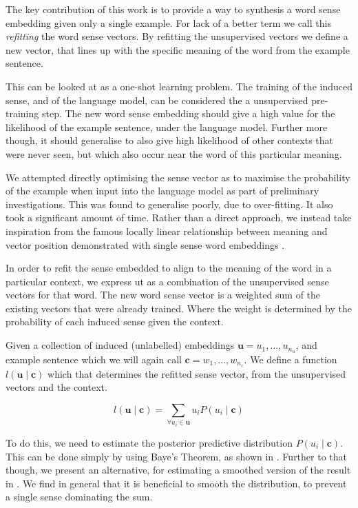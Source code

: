\documentclass{sig-alternate}
\renewcommand{\c}{\mathbf{c}}
\renewcommand{\u}{\mathbf{u}}
\begin{document}
The key contribution of this work is to provide a way to synthesis a word sense embedding given only a single example. For lack of a better term we call this \emph{refitting} the word sense vectors. By refitting the unsupervised vectors we define a new vector, that lines up with the specific meaning of the word from the example sentence.

This can be looked at as a one-shot learning problem.
The training of the induced sense, and of the language model, can be considered the a unsupervised pre-training step. The new word sense embedding should give a high value for the likelihood of the example sentence, under the language model. Further more though, it should generalise to also give high likelihood of other contexts that were never seen, but which also occur near the word of this particular meaning.

We attempted directly optimising the sense vector as to maximise the probability of the example when input into the language model as part of preliminary investigations. This was found to generalise poorly, due to over-fitting. It also took a significant amount of time. Rather than a direct approach, we instead take inspiration from the famous locally linear relationship between meaning and vector position demonstrated with single sense word embeddings \parencite{mikolov2013efficient,mikolovSkip,mikolov2013linguisticsubstructures}.

In order to refit the sense embedded to align to the meaning of the word in a particular context, we express ut as a combination of the unsupervised sense vectors for that word.
The new word sense vector is a weighted sum of the existing vectors that were already trained. Where the weight is determined by the probability of each induced sense given the context.


Given a collection of induced (unlabelled) embeddings $\u={u_1,...,u_{n_u}}$, and example sentence which we will again call $\c={w_1,...,w_{n_c}}$. We define a function $l(\u \mid \c )$ which that determines the refitted sense vector, from the unsupervised vectors and the context.

\begin{equation} \label{eq:synth}
l(\u \mid \c ) = \sum_{\forall u_i \in \u} u_i P(u_i \mid \c)
\end{equation}

To do this, we need to estimate the posterior predictive distribution $P(u_i \mid \c)$. 
This can be done simply by using Baye's Theorem, as shown in . Further to that though, we present an alternative, for estimating a smoothed version of the result in . We find in general that it is beneficial to smooth the distribution, to prevent a single sense dominating the sum.
\end{document}
